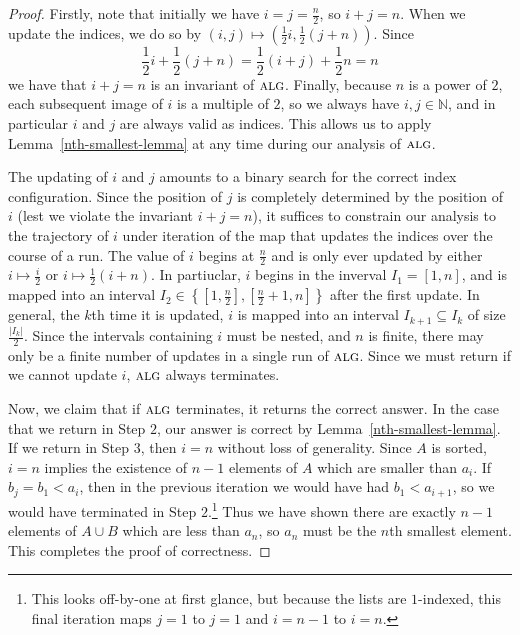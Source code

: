 \documentclass[11pt]{article}
\newcommand{\N}{\mathbb{N}}
\newcommand{\alg}{\textsc{alg}}
\begin{document}
\begin{proof}
  Firstly, note that initially we have $i = j = \frac{n}{2}$, so $i + j = n$.
  When we update the indices, we do so by $(i, j) \mapsto \left(\frac{1}{2}i, \frac{1}{2}(j + n)\right)$.
  Since \[\frac{1}{2}i + \frac{1}{2}(j + n) = \frac{1}{2}(i + j) + \frac{1}{2}n = n\] we have that $i + j = n$ is an invariant of $\alg$.
  Finally, because $n$ is a power of $2$, each subsequent image of $i$ is a multiple of $2$, so we always have $i, j \in \N$, and in particular $i$ and $j$ are always valid as indices.
  This allows us to apply Lemma~\ref{nth-smallest-lemma} at any time during our analysis of $\alg$.

  The updating of $i$ and $j$ amounts to a binary search for the correct index configuration.
  Since the position of $j$ is completely determined by the position of $i$ (lest we violate the invariant $i + j = n$), it suffices to constrain our analysis to the trajectory of $i$ under iteration of the map that updates the indices over the course of a run.
  The value of $i$ begins at $\frac{n}{2}$ and is only ever updated by either $i \mapsto \frac{i}{2}$ or $i \mapsto \frac{1}{2}(i + n)$.
  In partiuclar, $i$ begins in the inverval $I_1 = [1, n]$, and is mapped into an interval $I_2 \in \left\{[1, \frac{n}{2}], [\frac{n}{2} + 1, n]\right\}$ after the first update.
  In general, the $k$th time it is updated, $i$ is mapped into an interval $I_{k+1} \subseteq I_k$ of size $\frac{|I_k|}{2}$.
  Since the intervals containing $i$ must be nested, and $n$ is finite, there may only be a finite number of updates in a single run of $\alg$.
  Since we must return if we cannot update $i$, $\alg$ always terminates.

  Now, we claim that if $\alg$ terminates, it returns the correct answer.
  In the case that we return in Step $2$, our answer is correct by Lemma~\ref{nth-smallest-lemma}.
  If we return in Step $3$, then $i = n$ without loss of generality.
  Since $A$ is sorted, $i = n$ implies the existence of $n - 1$ elements of $A$ which are smaller than $a_i$.
  If $b_j = b_1 < a_i$, then in the previous iteration we would have had $b_1 < a_{i+1}$, so we would have terminated in Step $2$.\footnote{This looks off-by-one at first glance, but because the lists are $1$-indexed, this final iteration maps $j = 1$ to $j = 1$ and $i = n - 1$ to $i = n$.}
  Thus we have shown there are exactly $n - 1$ elements of $A \cup B$ which are less than $a_n$, so $a_n$ must be the $n$th smallest element.
  This completes the proof of correctness.
\end{proof}
\end{document}
